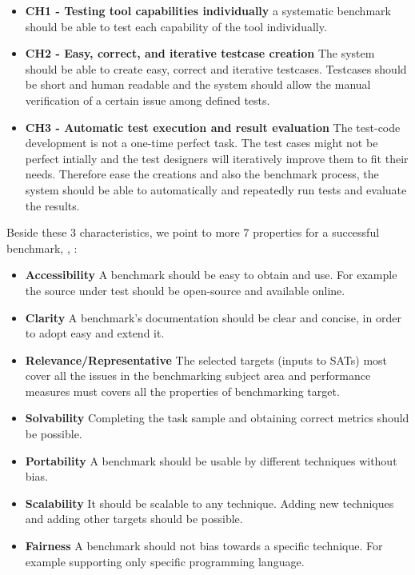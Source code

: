 \documentclass[authoryear,preprint]{sigplanconf}
\begin{document}
\begin{itemize}
	\item \textbf{CH1 - Testing tool capabilities individually} a systematic benchmark should be able to test each capability of the tool individually. 
	\item \textbf{CH2 - Easy, correct, and iterative testcase creation} The system should be able to create easy, correct and iterative testcases. Testcases should be short and human readable and the system should allow the manual verification of a certain issue among defined tests. 
	\item \textbf{CH3 - Automatic test execution and result evaluation} The test-code development is not a one-time perfect task. The test cases might not be perfect intially and the test designers will iteratively improve them to fit their needs. Therefore ease the creations and also the benchmark process, the system should be able to automatically and repeatedly run tests and evaluate the results. 
\end{itemize}

Beside these 3 characteristics, we point to more 7 properties for a successful benchmark, \cite{lu2005bugbench}, \cite{sim2003}:

 \begin{itemize}
	\item \textbf{Accessibility} A benchmark should be easy to obtain and use. For example the  source under test should be open-source and available online. 
	\item \textbf{Clarity} A benchmark’s documentation should be clear and concise, in order to adopt easy and extend it.
	\item \textbf{Relevance/Representative} The selected targets (inputs to SATs) most cover all the issues in the benchmarking subject area  and performance measures must covers all the properties of benchmarking target. 
	\item \textbf{Solvability} Completing the task sample and obtaining correct metrics should be possible. 
	\item \textbf{Portability} A benchmark should be usable by different techniques without bias. 
	\item \textbf{Scalability} It should be scalable to any technique. Adding new techniques and adding other targets should be possible. 
	\item \textbf{Fairness} A benchmark should not bias towards a specific technique. For example supporting only specific programming language.
\end{itemize}
\end{document}
